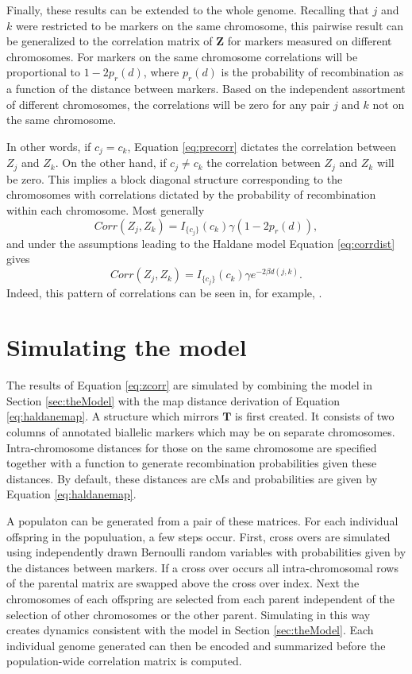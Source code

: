 \documentclass[12pt]{article}
\newcommand{\ve}[1]{\mathbf{#1}}           %
\newcommand{\m}[1]{\mathbf{#1}}               %
\newcommand{\ind}[2]{I_{#2} \left( #1 \right)}
\begin{document}
Finally, these results can be extended to the whole genome. Recalling that $j$ and $k$ were restricted to be markers on the same chromosome, this pairwise result can be generalized to the correlation matrix of $\ve{Z}$ for markers measured on different chromosomes. For markers on the same chromosome correlations will be proportional to $1 - 2p_r(d)$, where $p_r(d)$ is the probability of recombination as a function of the distance between markers. Based on the independent assortment of different chromosomes, the correlations will be zero for any pair $j$ and $k$ not on the same chromosome.

In other words, if $c_j = c_k$, Equation \ref{eq:precorr} dictates the correlation between $Z_j$ and $Z_k$. On the other hand, if $c_j \neq c_k$ the correlation between $Z_j$ and $Z_k$ will be zero. This implies a block diagonal structure corresponding to the chromosomes with correlations dictated by the probability of recombination within each chromosome. Most generally
\begin{equation} \label{eq:zcorr_gen}
  Corr(Z_j, Z_k) = \ind{c_k}{\{c_j\}} \gamma (1 - 2p_r(d)),
\end{equation}
and under the assumptions leading to the Haldane model Equation \ref{eq:corrdist} gives
\begin{equation} \label{eq:zcorr}
  Corr(Z_j, Z_k) = \ind{c_k}{\{c_j\}} \gamma e^{-2 \beta d(j,k)}.
\end{equation}
Indeed, this pattern of correlations can be seen in, for example, \cite{cheverudetal2001}.

\section{Simulating the model} \label{sec:sim}

The results of Equation \ref{eq:zcorr} are simulated by combining the model in Section \ref{sec:theModel} with the map distance derivation of Equation \ref{eq:haldanemap}. A structure which mirrors $\m{T}$ is first created. It consists of two columns of annotated biallelic markers which may be on separate chromosomes. Intra-chromosome distances for those on the same chromosome are specified together with a function to generate recombination probabilities given these distances. By default, these distances are cMs and probabilities are given by Equation \ref{eq:haldanemap}.

A populaton can be generated from a pair of these matrices. For each individual offspring in the populuation, a few steps occur. First, cross overs are simulated using independently drawn Bernoulli random variables with probabilities given by the distances between markers. If a cross over occurs all intra-chromosomal rows of the parental matrix are swapped above the cross over index. Next the chromosomes of each offspring are selected from each parent independent of the selection of other chromosomes or the other parent. Simulating in this way creates dynamics consistent with the model in Section \ref{sec:theModel}. Each individual genome generated can then be encoded and summarized before the population-wide correlation matrix is computed.
\end{document}
